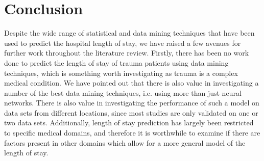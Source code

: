 \section{Conclusion}
Despite the wide range of statistical and data mining techniques that have been
used to predict the hospital length of stay, we have raised a few avenues for
further work throughout the literature review. Firstly, there has been no work
done to predict the length of stay of trauma patients using data mining
techniques, which is something worth investigating as trauma is a complex
medical condition. We have pointed out that there is also value in
investigating a number of the best data mining techniques, i.e. using more
than just neural networks. There is also value in investigating the performance
of such a model on data sets from different locations, since most studies are
only validated on one or two data sets. Additionally, length of stay prediction
has largely been restricted to specific medical domains, and therefore it is
worthwhile to examine if there are factors present in other domains which allow
for a more general model of the length of stay. 

